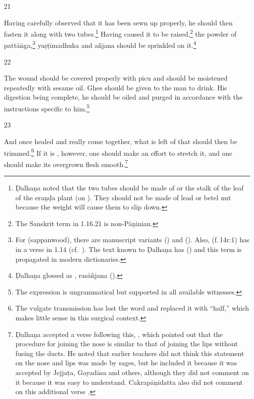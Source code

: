 \begin{translation}
\item[21] 
\begin{em}
Having carefully observed that it has been sewn up properly, he should then
fasten it along with two tubes.\footnote{Ḍalhaṇa noted that the two tubes
    should be made of  or the stalk of the leaf of the
    \gls{eraṇḍa} plant (on ). They should not be made of lead or betel
    nut because the weight will cause them to slip down.} Having caused it to be
    raised,\footnote{The Sanskrit term  in 1.16.21 is
        non-Pāṇinian.} the powder of \gls{pattāṅga},\footnote{\label{pattanga} For
             (sappanwood), there are manuscript variants 
            () and  ().  Also,  (f.\,14r:1) has  in
            a verse in 1.14 (cf.\ ). The text known to Ḍalhaṇa has
             () and this term is propagated in modern
            dictionaries.} \gls{yaṣṭīmadhuka} %
            and \gls{añjana} should be sprinkled on it.\footnote{Ḍalhaṇa
                glossed  as , \gls{rasāñjana}
                (\cite[81]{vulgate}).}
\end{em}    
\item[22] 
\begin{em}
 The wound should be covered properly with \gls{picu} and should be
moistened repeatedly with sesame oil.  Ghee should be given to the man to drink. 
His digestion being complete, he should be oiled and purged in accordance with
the instructions specific to him.\footnote{The expression 
    is ungrammatical but supported in all available witnesses.}
\end{em}
    
\item[23] %
\begin{em}
And once healed and really come together, what is left of that
 should then be trimmed.\footnote{The vulgate
    transmission has lost the word  and replaced it with
     “half,” which makes little sense in this surgical  context.}
    If it is , however, one should make an effort to
    stretch it, and one should make its overgrown flesh
    smooth.\footnote{Ḍalhaṇa accepted a verse following this,
        , which pointed out that the procedure for joining the
        nose is similar to that of joining the lips without fusing the ducts. He
        noted that earlier teachers did not think this statement on the nose and
        lips was made by sages, but he included it because it was accepted by
        Jejjaṭa, Gayadāsa and others, although they did not comment on it because
        it was easy to understand. Cakrapāṇidatta also did not comment on this
        additional verse \citep[133]{acar-1939}.}

\end{em}    
    
\end{translation}    
